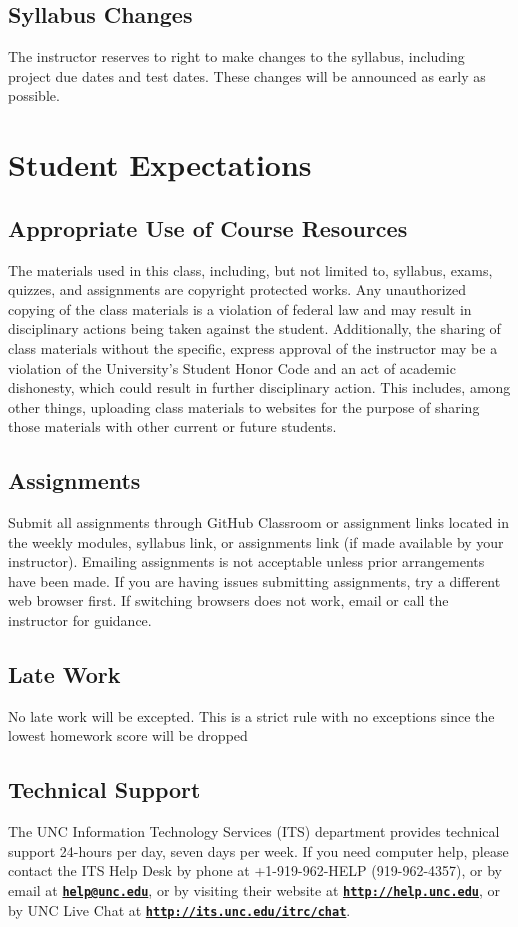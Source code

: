 \documentclass[11pt]{article}
\begin{document}
\subsection*{Syllabus Changes}
The instructor reserves to right to make changes to the syllabus, including project due dates and test dates. These changes will be announced as early as possible.

\section*{Student Expectations}
\subsection*{Appropriate Use of Course Resources}
The materials used in this class, including, but not limited to, syllabus, exams, quizzes, and assignments are copyright protected works. Any unauthorized copying of the class materials is a violation of federal law and may result in disciplinary actions being taken against the student. Additionally, the sharing of class materials without the specific, express approval of the instructor may be a 
violation of the University's Student Honor Code and an act of academic dishonesty, which could result in further disciplinary action. This includes, among other things, uploading class materials to websites for the purpose of sharing those materials with other current or future students. 

\subsection*{Assignments}
Submit all assignments through GitHub Classroom or assignment links located in the weekly modules, syllabus link, or assignments link (if made available by your instructor).  Emailing assignments is not acceptable unless prior arrangements have been 
made. If you are having issues submitting assignments, try a different web browser first. If switching browsers does not work, email or call the instructor for guidance. 

\subsection*{Late Work}
No late work will be excepted. This is a strict rule with no exceptions since the lowest homework score will be dropped

\subsection*{Technical Support}
The UNC Information Technology Services (ITS) department provides technical support 24-hours per day, seven days per week.  If you need computer help, please contact the ITS Help Desk by phone at +1-919-962-HELP (919-962-4357), or by email at \href{help@unc.edu}{\tt\bf help@unc.edu}, or by visiting their website at \href{http://help.unc.edu}{\tt\bf http://help.unc.edu}, or by UNC Live Chat at \href{http://its.unc.edu/itrc/chat}{\tt\bf http://its.unc.edu/itrc/chat}. 
\end{document}
